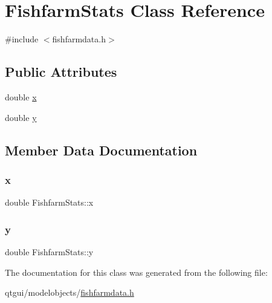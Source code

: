 \hypertarget{class_fishfarm_stats}{}\section{Fishfarm\+Stats Class Reference}
\label{class_fishfarm_stats}


{\ttfamily \#include $<$fishfarmdata.\+h$>$}

\subsection*{Public Attributes}
\begin{DoxyCompactItemize}
\item 
double \mbox{\hyperlink{class_fishfarm_stats_a2564b7eb955bbf2f2dc587da9ecfed9b}{x}}
\item 
double \mbox{\hyperlink{class_fishfarm_stats_a86198237f59461c9bce8ab1fd6b553a0}{y}}
\end{DoxyCompactItemize}


\subsection{Member Data Documentation}
\mbox{\label{class_fishfarm_stats_a2564b7eb955bbf2f2dc587da9ecfed9b}} 
\subsubsection{\texorpdfstring{x}{x}}
{\footnotesize\ttfamily double Fishfarm\+Stats\+::x}

\mbox{\label{class_fishfarm_stats_a86198237f59461c9bce8ab1fd6b553a0}} 
\subsubsection{\texorpdfstring{y}{y}}
{\footnotesize\ttfamily double Fishfarm\+Stats\+::y}



The documentation for this class was generated from the following file\+:\begin{DoxyCompactItemize}
\item 
qtgui/modelobjects/\mbox{\hyperlink{fishfarmdata_8h}{fishfarmdata.\+h}}\end{DoxyCompactItemize}
